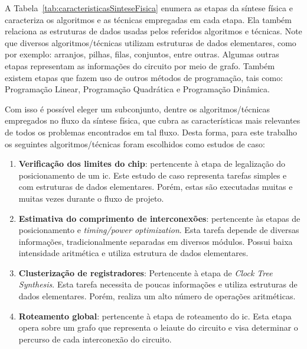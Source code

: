 
A Tabela~\ref{tab:caracteristicasSinteseFisica} enumera as etapas da síntese física e caracteriza os algoritmos e as técnicas empregadas em cada etapa. Ela também relaciona as estruturas de dados usadas pelos referidos algoritmos e técnicas.
Note que diversos algoritmos/técnicas utilizam estruturas de dados elementares, como por exemplo: arranjos, pilhas, filas, conjuntos, entre outras.
Algumas outras etapas representam as informações do circuito por meio de grafo.
Também existem etapas que fazem uso de outros métodos de programação, tais como: Programação Linear, Programação Quadrática e Programação Dinâmica.



Com isso é possível eleger um subconjunto, dentre os algoritmos/técnicas empregados no fluxo da síntese física, que cubra as características mais relevantes de todos os problemas encontrados em tal fluxo.
Desta forma, para este trabalho os seguintes algoritmos/técnicas foram escolhidos como estudos de caso:
\begin{enumerate}
    \itemsep0em
    \item \textbf{Verificação dos limites do chip}: pertencente à etapa de legalização do posicionamento de um \ac{ic}. Este estudo de caso representa tarefas simples e com estruturas de dados elementares. Porém, estas são executadas muitas e muitas vezes durante o fluxo de projeto.
    \item \textbf{Estimativa do comprimento de interconexões}: pertencente às etapas de posicionamento e \textit{timing/power optimization}. Esta tarefa depende de diversas informações, 
    tradicionalmente separadas em diversos módulos. Possui baixa intensidade aritmética e utiliza estrutura de dados elementares.
    \item \textbf{Clusterização de registradores}: Pertencente à etapa de \textit{Clock Tree Synthesis}. Esta tarefa necessita de poucas informações e utiliza estruturas de dados elementares. Porém, realiza um alto número de operações aritméticas. 
    \item \textbf{Roteamento global}: pertencente à etapa de roteamento do \ac{ic}. Esta etapa opera sobre um grafo que representa o leiaute do circuito e visa determinar o percurso de cada interconexão do circuito.
\end{enumerate}

